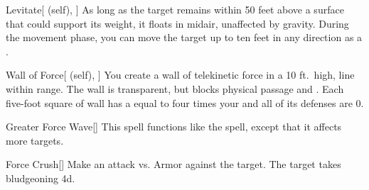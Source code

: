 \lowercase{\hypertarget{spell:Levitate}{}}\label{spell:Levitate}
\begin{attuneability}[Rank 5]{\hypertarget{spell:Levitate}{Levitate}}[ (self), ]
As long as the target remains within 50 feet above a surface that could support its weight, it floats in midair, unaffected by gravity.
During the movement phase, you can move the target up to ten feet in any direction as a .
\end{attuneability}
\vspace{0.25em}



\lowercase{\hypertarget{spell:Wall of Force}{}}\label{spell:Wall of Force}
\begin{attuneability}[Rank 5]{\hypertarget{spell:Wall of Force}{Wall of Force}}[ (self), ]
\targetrule
You create a wall of telekinetic force in a 10 ft.\ high, \arealarge line within \rngmed range.
The wall is transparent, but blocks physical passage and .
Each five-foot square of wall has a  equal to four times your  and all of its defenses are 0.
\end{attuneability}
\vspace{0.25em}



\lowercase{\hypertarget{spell:Greater Force Wave}{}}\label{spell:Greater Force Wave}
\begin{freeability}[Rank 6]{\hypertarget{spell:Greater Force Wave}{Greater Force Wave}}[]
This spell functions like the  spell, except that it affects more targets.
\end{freeability}
\vspace{0.25em}



\lowercase{\hypertarget{spell:Force Crush}{}}\label{spell:Force Crush}
\begin{freeability}[Rank 7]{\hypertarget{spell:Force Crush}{Force Crush}}[]
Make an attack vs. Armor against the target.
\hit The target takes bludgeoning  \plus4d.
\end{freeability}
\vspace{0.25em}



